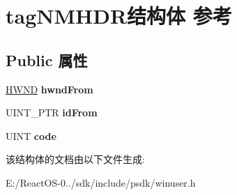 \hypertarget{structtag_n_m_h_d_r}{}\section{tag\+N\+M\+H\+D\+R结构体 参考}
\label{structtag_n_m_h_d_r}
\subsection*{Public 属性}
\begin{DoxyCompactItemize}
\item 
\mbox{\label{structtag_n_m_h_d_r_af90ed893fa08d9ab7b6a98bde078e4e1}} 
\hyperlink{interfacevoid}{H\+W\+ND} {\bfseries hwnd\+From}
\item 
\mbox{\label{structtag_n_m_h_d_r_a1c9239520d7683d50d6e8040f3517bb1}} 
U\+I\+N\+T\+\_\+\+P\+TR {\bfseries id\+From}
\item 
\mbox{\label{structtag_n_m_h_d_r_a98e42438cf1b305e65f4942a38fda89b}} 
U\+I\+NT {\bfseries code}
\end{DoxyCompactItemize}


该结构体的文档由以下文件生成\+:\begin{DoxyCompactItemize}
\item 
E\+:/\+React\+O\+S-\/0../sdk/include/psdk/winuser.\+h\end{DoxyCompactItemize}
